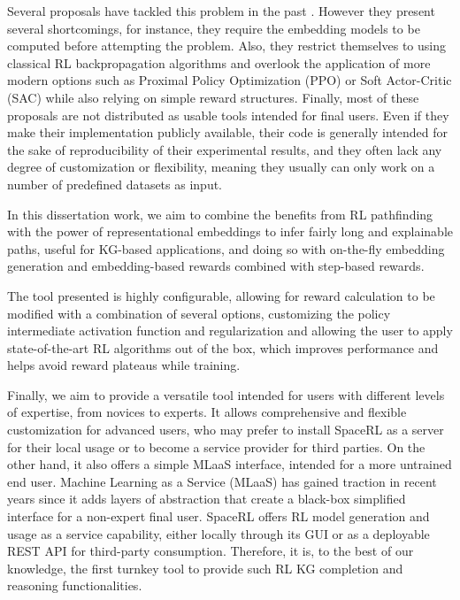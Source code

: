Several proposals have tackled this problem in the past \cite{xiong2017deeppath, das2017go, lin2018multi, xian2019reinforcement}. However they present several shortcomings, for instance, they require the embedding models to be computed before attempting the problem. Also, they restrict themselves to using classical RL backpropagation algorithms and overlook the application of more modern options such as Proximal Policy Optimization (PPO)\cite{schulman2017proximal} or Soft Actor-Critic (SAC) \cite{haarnoja2018soft} while also relying on simple reward structures. Finally, most of these proposals are not distributed as usable tools intended for final users. Even if they make their implementation publicly available, their code is generally intended for the sake of reproducibility of their experimental results, and they often lack any degree of customization or flexibility, meaning they usually can only work on a number of predefined datasets as input.

In this dissertation work, we aim to combine the benefits from RL pathfinding with the power of representational embeddings to infer fairly long and explainable paths, useful for KG-based applications, and doing so with on-the-fly embedding generation and embedding-based rewards combined with step-based rewards.

The tool presented is highly configurable, allowing for reward calculation to be modified with a combination of several options, customizing the policy intermediate activation function and regularization and allowing the user to apply state-of-the-art RL algorithms out of the box, which improves performance and helps avoid reward plateaus while training.

Finally, we aim to provide a versatile tool intended for users with different levels of expertise, from novices to experts. It allows comprehensive and flexible customization for advanced users, who may prefer to install SpaceRL as a server for their local usage or to become a service provider for third parties. On the other hand, it also offers a simple MLaaS interface, intended for a more untrained end user. Machine Learning as a Service (MLaaS) has gained traction in recent years since it adds layers of abstraction that create a black-box simplified interface for a non-expert final user. SpaceRL offers RL model generation and usage as a service capability, either locally through its GUI or as a deployable REST API for third-party consumption. Therefore, it is, to the best of our knowledge, the first turnkey tool to provide such RL KG completion and reasoning functionalities.

